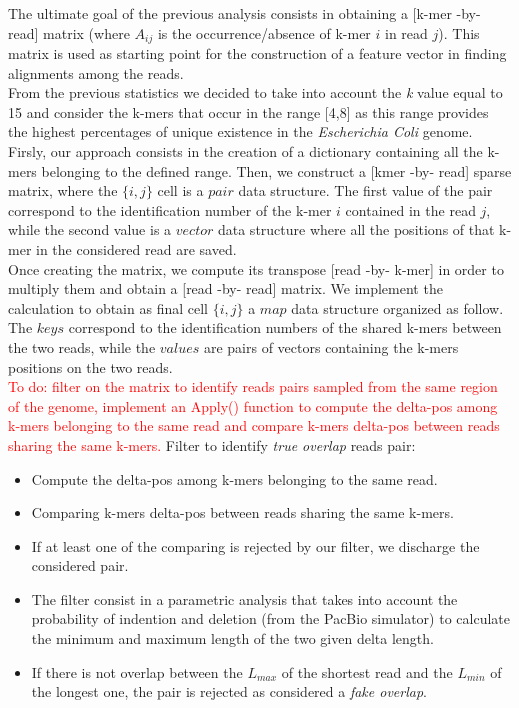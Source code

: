 \documentclass[11pt]{article}
\newcommand\myworries[1]{\textcolor{red}{#1}}
\begin{document}
The ultimate goal of the previous analysis consists in obtaining a [k-mer -by- read] matrix (where $A_{ij}$ is the occurrence/absence of k-mer $i$ in read $j$).
This matrix is used as starting point for the construction of a feature vector in finding alignments among the reads.\\
From the previous statistics we decided to take into account the \emph{k} value equal to 15 and consider the k-mers that occur in the range [4,8] as this range provides the highest percentages of unique existence in the \emph{Escherichia Coli} genome.\\
Firsly, our approach consists in the creation of a dictionary containing all the k-mers belonging to the defined range.
Then, we construct a [kmer -by- read] sparse matrix, where the ${\{i,j\}}$ cell is a $pair$ data structure.
The first value of the pair correspond to the identification number of the k-mer $i$ contained in the read $j$, while the second value is a $vector$ data structure where all the positions of that k-mer in the considered read are saved.\\
Once creating the matrix, we compute its transpose [read -by- k-mer] in order to multiply them and obtain a [read -by- read] matrix.
We implement the calculation to obtain as final cell ${\{i,j\}}$ a $map$ data structure organized as follow.
The $keys$ correspond to the identification numbers of the shared k-mers between the two reads, while the $values$ are pairs of vectors containing the k-mers positions on the two reads.\\
\myworries{To do: filter on the matrix to identify reads pairs sampled from the same region of the genome, implement an Apply() function to compute the delta-pos among k-mers belonging to the same read and compare k-mers delta-pos between reads sharing the same k-mers.}
Filter to identify \emph{true overlap} reads pair:
\begin{itemize}
    \item Compute the delta-pos among k-mers belonging to the same read.
    \item Comparing k-mers delta-pos between reads sharing the same k-mers.
    \item If at least one of the comparing is rejected by our filter, we discharge the considered pair.
    \item The filter consist in a parametric analysis that takes into account the probability of indention and deletion (from the PacBio simulator) to calculate the minimum and maximum length of the two given delta length.
    \item If there is not overlap between the $L_{max}$ of the shortest read and the $L_{min}$ of the longest one, the pair is rejected as considered a \emph{fake overlap}.
\end{itemize}
\end{document}
